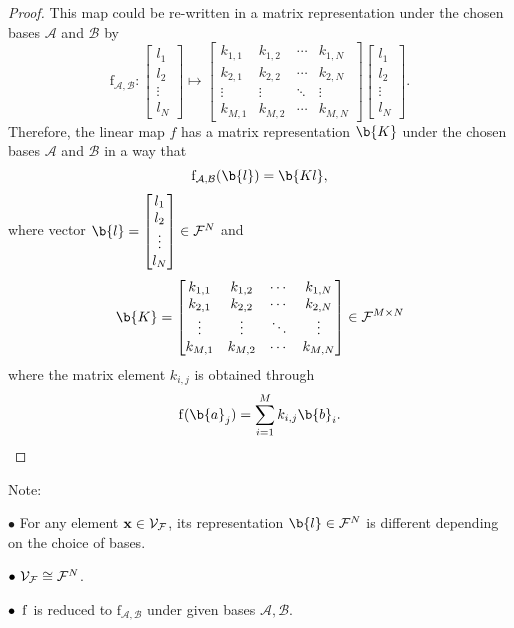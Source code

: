 \begin{proof}
This map could be re-written in a matrix representation under the chosen bases $\mathcal{A}$ and $\mathcal{B}$ by
$$\operatorname{f_{\mathcal{A,B}}}:
\begin{bmatrix}
l_1 \\
l_2 \\
\vdots \\
l_N
\end{bmatrix}
\mapsto 
\begin{bmatrix}
k_{1,1} &k_{1,2} &\cdots &k_{1,N} \\
k_{2,1} &k_{2,2} &\cdots &k_{2,N} \\
\vdots  &\vdots  &\ddots &\vdots  \\
k_{M,1} &k_{M,2} &\cdots &k_{M,N} 
\end{bmatrix}
\begin{bmatrix}
l_1 \\
l_2 \\
\vdots \\
l_N
\end{bmatrix}.
$$
%
Therefore, the linear map $f$ has a matrix representation $\b{K}$ under the chosen bases $\mathcal{A}$ and $\mathcal{B}$ in a way that $$\operatorname{f_{\mathcal{A,B}}}(\b{l}) = \b{Kl},$$
where vector $\b{l} = 
\begin{bmatrix}
    l_1\\
    l_2\\
    \vdots\\ 
    l_N
\end{bmatrix} \in \mathcal{F}^N$ 
and
$$ \b{K} =
\begin{bmatrix}
k_{1,1} &k_{1,2} &\cdots &k_{1,N} \\
k_{2,1} &k_{2,2} &\cdots &k_{2,N} \\
\vdots  &\vdots  &\ddots &\vdots  \\
k_{M,1} &k_{M,2} &\cdots &k_{M,N} 
\end{bmatrix} \in \mathcal{F}^{M \times N}
$$
where the matrix element $k_{i,j}$ is obtained through 
%
$$\f(\b{a}_j) =\sum_{i=1}^{M} k_{i, j}\b{b}_i.$$
%
\end{proof}


Note: 

$\bullet$ For any element $\mathbf{x} \in \mathcal{V}_{\mathcal{F}}$, its representation $\b{l} \in \mathcal{F}^N$ is different depending on the choice of bases.

$\bullet \,\,  \mathcal{V}_{\mathcal{F}} \cong \mathcal{F}^N$.

$\bullet \,\, \operatorname{f}$ is reduced to $\operatorname{f_{\mathcal{A,B}}}$ under given bases $\mathcal{A,B}$. 


